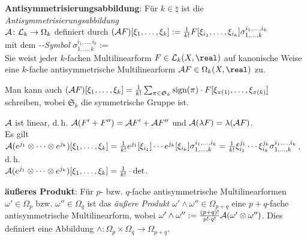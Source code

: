 \linie
\pagebreak

\textbf{Antisymmetrisierungsabbildung}:
Für $k \in \natural$ ist die \emph{Antisymmetrisierungsabbildung} \\
$\mathcal{A}\colon \mathcal{L}_k \rightarrow \Omega_k$ definiert durch
$(\mathcal{A} F)[\xi_1, \dotsc, \xi_k] :=
\frac{1}{k!} F[\xi_{i_1}, \dotsc, \xi_{i_k}]
\sigma_{1,\dotsc,k}^{i_1,\dotsc,i_k}$ \\
mit dem \emph{--Symbol}
$\sigma_{1,\dotsc,k}^{i_1,\dotsc,i_k} :=$  \\
Sie weist jeder $k$-fachen Multilinearform $F \in \L_k(X, \real)$ auf
kanonische Weise eine $k$-fache antisymmetrische Multilinearform
$\A F \in \Omega_k(X, \real)$ zu.

Man kann auch
$(\mathcal{A} F)[\xi_1, \dotsc, \xi_k] =
\frac{1}{k!} \sum_{\pi \in \mathfrak{S}_k}
\operatorname{sign}(\pi) \cdot F[\xi_{\pi(1)}, \dotsc, \xi_{\pi(k)}]$
schreiben, wobei $\mathfrak{S}_k$ die symmetrische Gruppe ist.

$\mathcal{A}$ ist linear, d.\,h. $\mathcal{A}(F' + F'') = \mathcal{A} F' + \mathcal{A} F''$ und
$\mathcal{A} (\lambda F) = \lambda (\mathcal{A} F)$. \\
Es gilt $\mathcal{A}(e^{j_1} \otimes \dotsb \otimes e^{j_k})[\xi_1, \dotsc, \xi_k]
= \frac{1}{k!} e^{j_1}[\xi_{i_1}] \dotsm e^{j_k}[\xi_{i_k}]
\sigma_{1,\dotsc,k}^{i_1,\dotsc,i_k} =
\frac{1}{k!} \xi_{i_1}^{j_1} \dotsm \xi_{i_k}^{j_k}
\sigma_{1,\dotsc,k}^{i_1,\dotsc,i_k}$, d.\,h. \\
$\mathcal{A}(e^{j_1} \otimes \dotsb \otimes e^{j_k})[\xi_1, \dotsc, \xi_k] =
\frac{1}{k!} \cdot
\det$.

\vspace{3mm}
\linie

\textbf{äußeres Produkt}:
Für $p$- bzw. $q$-fache antisymmetrische Multilinearformen
$\omega' \in \Omega_p$ bzw. $\omega'' \in \Omega_q$ ist das
\emph{äußere Produkt} $\omega' \land \omega'' \in \Omega_{p+q}$ eine
$p + q$-fache antisymmetrische Multilinearform, wobei
$\omega' \land \omega'' :=
\frac{(p + q)!}{p! \cdot q!} \mathcal{A}(\omega' \otimes \omega'')$.
Dies definiert eine Abbildung
$\land\colon \Omega_p \times \Omega_q \rightarrow \Omega_{p+q}$.

